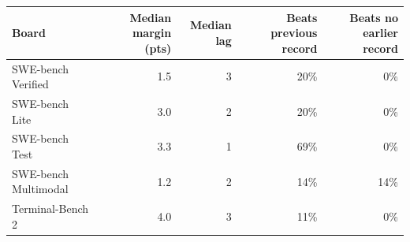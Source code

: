 \begin{tabular}{lrrrr}
\toprule
Board & Median margin (pts) & Median lag & Beats previous record & Beats no earlier record \\
\midrule
SWE-bench Verified & 1.5 & 3 & 20\% & 0\% \\
SWE-bench Lite & 3.0 & 2 & 20\% & 0\% \\
SWE-bench Test & 3.3 & 1 & 69\% & 0\% \\
SWE-bench Multimodal & 1.2 & 2 & 14\% & 14\% \\
Terminal-Bench 2 & 4.0 & 3 & 11\% & 0\% \\
\bottomrule
\end{tabular}
